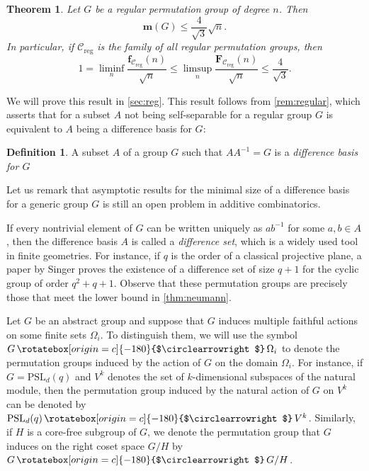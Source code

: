 \documentclass[a4paper]{amsart}
\newcommand{\f}{\mathbf{f}}
\newcommand{\F}{\mathbf{F}}
\newcommand{\m}{\mathbf{m}}
\newcommand{\C}{\mathcal{C}}
\newcommand{\act}{\,\rotatebox[origin=c]{-180}{$\circlearrowright$}\,}
\newtheorem{thmx}{Theorem}[]
\theoremstyle{definition}
\newtheorem{de}[theorem]{Definition}
\begin{document}
\begin{thmx}\label{thm:regular}
    Let $G$ be a regular permutation group of degree $n$. Then
    \[  \m(G) \le \frac{4}{\sqrt3} \sqrt{n} .\]
    In particular, if $\C_{\mathrm{reg}}$ is the family of all regular permutation groups, then
    \[1 = \liminf_n \frac{\f_{\mathcal{C}_{\mathrm{reg}}}(n)}{\sqrt{n}}  \le  \limsup_n \frac{\F_{\mathcal{C}_{{\mathrm{reg}}}}(n)}{\sqrt{n}} \le \frac{4}{\sqrt3} .\]
\end{thmx}
We will prove this result in \cref{sec:reg}.
This result follows from \cref{rem:regular}, which asserts that for a subset $A$ not being self-separable for a regular group $G$ is equivalent to $A$ being a difference basis for $G$:

\begin{de}\label{de:differenceBasis}
    A subset $A$ of a group $G$ such that $AA^{-1} = G$ is a \emph{difference basis for $G$}
\end{de}

Let us remark that asymptotic results for the minimal size of a difference basis for a generic group $G$ is still an open problem in additive combinatorics.

If every nontrivial element of $G$ can be written uniquely as $ab^{-1}$ for some $a,b \in A$, then the difference basis $A$ is called a \emph{difference set}, which is a widely used tool in finite geometries. For instance, if $q$ is the order of a classical projective plane, a paper 
\cite{Singer1938} by Singer
proves the existence of a difference set of size $q+1$ for the cyclic group of order $q^2+q+1$. Observe that these permutation groups are precisely those that meet the lower bound in \cref{thm:neumann}.

Let $G$ be an abstract group and suppose that $G$ induces multiple faithful actions on some finite sets $\Omega_i$. To distinguish them, we will use the symbol $G \act \Omega_i$ to denote the permutation groups induced by the action of $G$ on the domain $\Omega_i$. For instance, if $G=\mathrm{PSL}_d(q)$ and $V^k$ denotes the set of $k$-dimensional subspaces of the natural module, then the permutation group induced by the natural action of $G$ on $V^k$ can be denoted by $\mathrm{PSL}_d(q) \act V^k$. Similarly, if $H$ is a core-free subgroup of $G$, we denote the permutation group that $G$ induces on the right coset space $G/H$ by $G \act G/H$.
\end{document}

